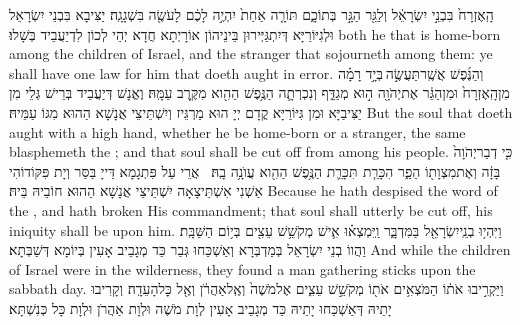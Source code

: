 {הָֽאֶזְרָח֙ בִּבְנֵ֣י יִשְׂרָאֵ֔ל וְלַגֵּ֖ר הַגָּ֣ר בְּתוֹכָ֑ם תּוֹרָ֤ה אַחַת֙ יִהְיֶ֣ה לָכֶ֔ם לָעֹשֶׂ֖ה בִּשְׁגָגָֽה׃}
{יַצִּיבָא בִּבְנֵי יִשְׂרָאֵל וּלְגִיּוֹרַיָּא דְּיִתְגַּיְּירוּן בֵּינֵיהוֹן אוֹרָיְתָא חֲדָא יְהֵי לְכוֹן לִדְיַעֲבֵיד בְּשָׁלוּ׃}
{both he that is home-born among the children of Israel, and the stranger that sojourneth among them: ye shall have one law for him that doeth aught in error.}{}
{וְהַנֶּ֜פֶשׁ אֲשֶֽׁר\maqqaf תַּעֲשֶׂ֣ה \legarmeh  בְּיָ֣ד רָמָ֗ה מִן\maqqaf הָֽאֶזְרָח֙ וּמִן\maqqaf הַגֵּ֔ר אֶת\maqqaf יְהֹוָ֖ה ה֣וּא מְגַדֵּ֑ף וְנִכְרְתָ֛ה הַנֶּ֥פֶשׁ הַהִ֖וא מִקֶּ֥רֶב עַמָּֽהּ׃}
{וֶאֱנָשׁ דְּיַעֲבֵיד בְּרֵישׁ גְּלֵי מִן יַצִּיבַיָּא וּמִן גִּיּוֹרַיָּא קֳדָם יְיָ הוּא מַרְגֵּיז וְיִשְׁתֵּיצֵי אֲנָשָׁא הַהוּא מִגּוֹ עַמֵּיהּ׃}
{But the soul that doeth aught with a high hand, whether he be home-born or a stranger, the same blasphemeth the \lord; and that soul shall be cut off from among his people.}{}
{כִּ֤י דְבַר\maqqaf יְהֹוָה֙ בָּזָ֔ה וְאֶת\maqqaf מִצְוָת֖וֹ הֵפַ֑ר הִכָּרֵ֧ת \pasek  תִּכָּרֵ֛ת הַנֶּ֥פֶשׁ הַהִ֖וא עֲוֺנָ֥ה בָֽהּ׃ \petucha }
{אֲרֵי עַל פִּתְגָמָא דַּייָ בַּסַּר וְיָת פִּקּוֹדוֹהִי אַשְׁנִי אִשְׁתֵּיצָאָה יִשְׁתֵּיצֵי אֲנָשָׁא הַהוּא חוֹבֵיהּ בֵּיהּ׃}
{Because he hath despised the word of the \lord, and hath broken His commandment; that soul shall utterly be cut off, his iniquity shall be upon him.}{}
{וַיִּהְי֥וּ בְנֵֽי\maqqaf יִשְׂרָאֵ֖ל בַּמִּדְבָּ֑ר וַֽיִּמְצְא֗וּ אִ֛ישׁ מְקֹשֵׁ֥שׁ עֵצִ֖ים בְּי֥וֹם הַשַּׁבָּֽת׃}
{וַהֲווֹ בְנֵי יִשְׂרָאֵל בְּמַדְבְּרָא וְאַשְׁכַּחוּ גְּבַר כַּד מְגָבֵיב אָעִין בְּיוֹמָא דְּשַׁבְּתָא׃}
{And while the children of Israel were in the wilderness, they found a man gathering sticks upon the sabbath day.}{}
{וַיַּקְרִ֣יבוּ אֹת֔וֹ הַמֹּצְאִ֥ים אֹת֖וֹ מְקֹשֵׁ֣שׁ עֵצִ֑ים אֶל\maqqaf מֹשֶׁה֙ וְאֶֽל\maqqaf אַהֲרֹ֔ן וְאֶ֖ל כׇּל\maqqaf הָעֵדָֽה׃}
{וְקָרִיבוּ יָתֵיהּ דְּאַשְׁכַּחוּ יָתֵיהּ כַּד מְגָבֵיב אָעִין לְוָת מֹשֶׁה וּלְוָת אַהֲרֹן וּלְוָת כָּל כְּנִשְׁתָּא׃}
